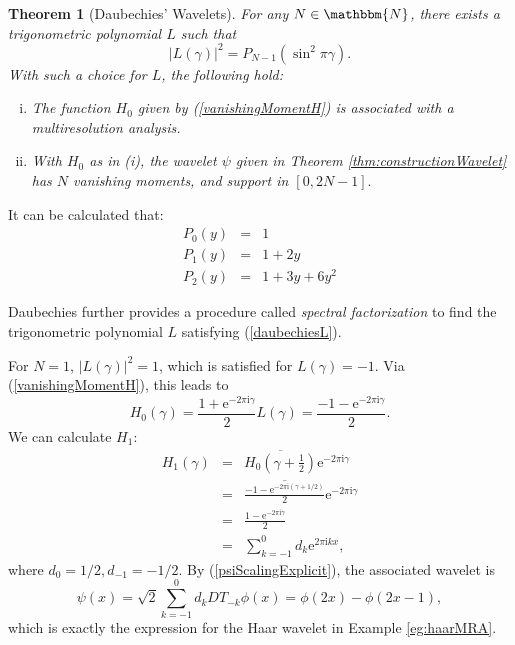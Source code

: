 \documentclass{book}
\newcommand{\mathe}{\mathrm{e}}
\newcommand{\mathi}{\mathrm{i}}
\newcommand{\mathpi}{\pi}
\newcommand{\tmtextit}[1]{{\itshape{#1}}}
\newenvironment{enumerateroman}{\begin{enumerate}[i.] }{\end{enumerate}}
\newtheorem{theorem}{Theorem}
\begin{document}
\begin{theorem}[Daubechies' Wavelets]
  For any $N \in \mathbbm{N}$, there exists a trigonometric polynomial $L$
  such that
  \begin{equation}
    | L (\gamma) |^2 = P_{N - 1} (\sin^2 \mathpi \gamma) . \label{daubechiesL}
  \end{equation}
  With such a choice for $L$, the following hold:
  \begin{enumerateroman}
    \item The function $H_0$ given by (\ref{vanishingMomentH}) is associated
    with a multiresolution analysis.
    
    \item With $H_0$ as in (i), the wavelet $\psi$ given in Theorem
    \ref{thm:constructionWavelet} has $N$ vanishing moments, and support in
    $[0, 2 N - 1] .$
  \end{enumerateroman}
\end{theorem}

\begin{example}
  It can be calculated that:
  \begin{eqnarray*}
    P_0 (y) & = & 1\\
    P_1 (y) & = & 1 + 2 y\\
    P_2 (y) & = & 1 + 3 y + 6 y^2
  \end{eqnarray*}
\end{example}

Daubechies further provides a procedure called \tmtextit{spectral
factorization} to find the trigonometric polynomial $L$ satisfying
(\ref{daubechiesL}).

\begin{example}[Spectral Factorization with $N = 1$]
  For $N = 1$, $| L (\gamma) |^2 = 1$, which is satisfied for $L (\gamma) = -
  1$. Via (\ref{vanishingMomentH}), this leads to
  \[ H_0 (\gamma) = \frac{1 + \mathe^{- 2 \mathpi \mathi \gamma}}{2} L
     (\gamma) = \frac{- 1 - \mathe^{- 2 \mathpi \mathi \gamma}}{2} . \]
  We can calculate $H_1$:
  \begin{eqnarray*}
    H_1 (\gamma) & = & \overline{H_0 \left( \gamma + \frac{1}{2} \right)}
    \mathe^{- 2 \mathpi \mathi \gamma}\\
    & = & \overline{\frac{- 1 - \mathe^{- 2 \mathpi \mathi (\gamma + 1 /
    2)}}{2}} \mathe^{- 2 \mathpi \mathi \gamma}\\
    & = & \frac{1 - \mathe^{- 2 \mathpi \mathi \gamma}}{2}\\
    & = & \sum_{k = - 1}^0 d_k \mathe^{2 \mathpi \mathi k x},
  \end{eqnarray*}
  where $d_0 = 1 / 2, d_{- 1} = - 1 / 2$. By (\ref{psiScalingExplicit}), the
  associated wavelet is
  \[ \psi (x) = \sqrt{2} \sum_{k = - 1}^0 d_k D T_{- k} \phi (x) = \phi (2 x)
     - \phi (2 x - 1), \]
  which is exactly the expression for the Haar wavelet in Example
  \ref{eg:haarMRA}.
\end{example}
\end{document}
